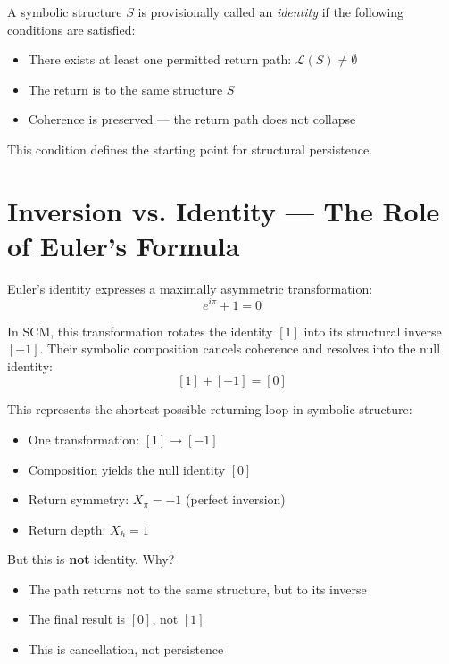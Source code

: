 \begin{definition}[Identity] \label{def:identity}
A symbolic structure $S$ is provisionally called an \textit{identity} if the following conditions are satisfied:
\begin{itemize}
  \item There exists at least one permitted return path: $\mathcal{L}(S) \neq \emptyset$
  \item The return is to the same structure $S$
  \item Coherence is preserved — the return path does not collapse
\end{itemize}

This condition defines the starting point for structural persistence.
\end{definition}

\section{Inversion vs. Identity — The Role of Euler’s Formula}

Euler's identity expresses a maximally asymmetric transformation:
\begin{equation} \label{eq:euler-math}
e^{i\pi} + 1 = 0
\end{equation}

In SCM, this transformation rotates the identity $[1]$ into its structural inverse $[-1]$. Their symbolic composition cancels coherence and resolves into the null identity:
\begin{equation} \label{eq:euler-null}
[1] + [-1] = [0]
\end{equation}

This represents the shortest possible returning loop in symbolic structure:
\begin{itemize}
  \item One transformation: $[1] \rightarrow [-1]$
  \item Composition yields the null identity $[0]$
  \item Return symmetry: $X_\pi = -1$ (perfect inversion)
  \item Return depth: $X_h = 1$
\end{itemize}

But this is \textbf{not} identity. Why?

\begin{itemize}
  \item The path returns not to the same structure, but to its inverse
  \item The final result is $[0]$, not $[1]$
  \item This is cancellation, not persistence
\end{itemize}

